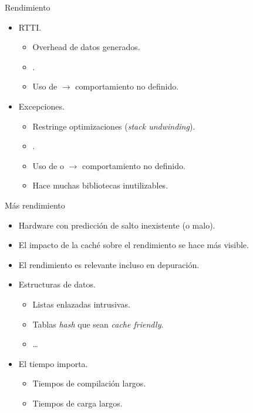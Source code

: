 \begin{frame}[t]{Rendimiento}
\begin{itemize}
  \item RTTI.
    \begin{itemize}
      \item Overhead de datos generados.
      \item {}.
      \item Uso de  $\rightarrow$ \alert{comportamiento no definido}.
    \end{itemize}
  \vfill\pause
  \item Excepciones.
    \begin{itemize}
      \item Restringe optimizaciones (\emph{stack undwinding}).
      \item {}.
      \item Uso de  o   $\rightarrow$ \alert{comportamiento no definido}.
      \item Hace muchas bibliotecas inutilizables.
    \end{itemize}
\end{itemize}
\end{frame}

\begin{frame}[t]{Más rendimiento}
\begin{itemize}
  \item Hardware con predicción de salto inexistente (o malo).
  \item El impacto de la caché sobre el rendimiento se hace más visible.
  \item El rendimiento es relevante incluso en depuración.
  \item Estructuras de datos.
    \begin{itemize}
      \item Listas enlazadas intrusivas.
      \item Tablas \emph{hash} que sean \emph{cache friendly}.
      \item \ldots
    \end{itemize}
  \item El tiempo importa.
    \begin{itemize}
      \item Tiempos de compilación largos.
      \item Tiempos de carga largos.
    \end{itemize}
\end{itemize}
\end{frame}
